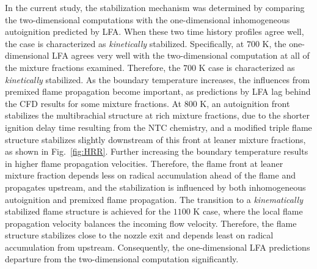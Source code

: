 \documentclass[review,3p,times]{elsarticle}
\begin{document}
\textcolor{mycolor}{In the current study, the stabilization mechanism was determined by comparing the two-dimensional computations with the one-dimensional inhomogeneous autoignition predicted by LFA.  When these two time history profiles agree well, the case is characterized as \emph{kinetically} stabilized.  Specifically, at $700$ K, the one-dimensional LFA agrees very well with the two-dimensional computation at all of the mixture fractions examined.  Therefore, the $700$ K case is characterized as \emph{kinetically} stabilized.  As the boundary temperature increases, the influences from premixed flame propagation become important, as predictions by LFA lag behind the CFD results for some mixture fractions.  At $800$ K, an autoignition front stabilizes the multibrachial structure at rich mixture fractions, due to the shorter ignition delay time resulting from the NTC chemistry, and a modified triple flame structure stabilizes slightly downstream of this front at leaner mixture fractions, as shown in Fig.~\ref{fig:HRR}.  Further increasing the boundary temperature results in higher flame propagation velocities.  Therefore, the flame front at leaner mixture fraction depends less on radical accumulation ahead of the flame and propagates upstream, and the stabilization is influenced by both inhomogeneous autoignition and premixed flame propagation.  The transition to a \emph {kinematically} stabilized flame structure is achieved for the $1100$ K case, where the local flame propagation velocity balances the incoming flow velocity.  Therefore, the flame structure stabilizes close to the nozzle exit and depends least on radical accumulation from upstream.  Consequently, the one-dimensional LFA predictions departure from the two-dimensional computation significantly.}
\end{document}
